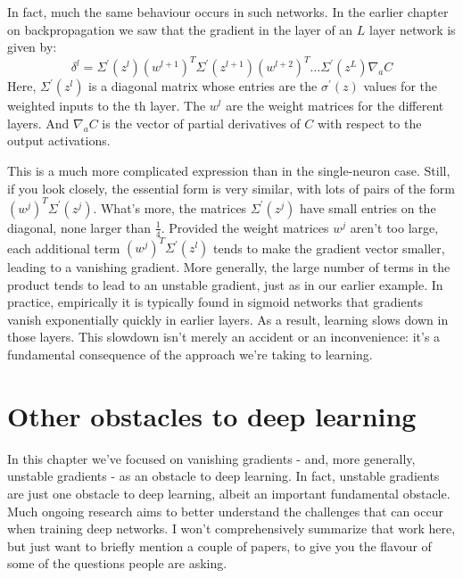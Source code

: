 In fact, much the same behaviour occurs in such networks. In the earlier chapter on backpropagation we saw that the gradient in the \mth{]} layer of an $L$ layer network is given by:
\begin{equation}
    \delta^{l}=\Sigma^{\prime}\left(z^{l}\right)\left(w^{l+1}\right)^{T} \Sigma^{\prime}\left(z^{l+1}\right)\left(w^{l+2}\right)^{T} \ldots \Sigma^{\prime}\left(z^{L}\right) \nabla_{a} C
    \label{eq:c05-124}
\end{equation}
Here, $\Sigma^{\prime}\left(z^{l}\right)$ is a diagonal matrix whose entries are the $\sigma^\prime(z)$ values for the weighted inputs to the th layer. The $w^l$ are the weight matrices for the different layers. And $\nabla_a C$ is the vector of partial derivatives of $C$ with respect to the output activations.

This is a much more complicated expression than in the single-neuron case. Still, if you look closely, the essential form is very similar, with lots of pairs of the form $\left(w^{j}\right)^{T} \Sigma^{\prime}\left(z^{j}\right)$. What's more, the matrices $\Sigma^{\prime}\left(z^{j}\right)$ have small entries on the diagonal, none larger than $\frac{1}{4}$. Provided the weight matrices $w^j$ aren't too large, each additional term $\left(w^{j}\right)^{T} \Sigma^{\prime}\left(z^{l}\right)$ tends to make the gradient vector smaller, leading to a vanishing gradient. More generally, the large number of terms in the product tends to lead to an unstable gradient, just as in our earlier example. In practice, empirically it is typically found in sigmoid networks that gradients vanish exponentially quickly in earlier layers. As a result, learning slows down in those layers. This slowdown isn't merely an accident or an inconvenience: it's a fundamental consequence of the approach we're taking to learning.

\section{Other obstacles to deep learning}

In this chapter we've focused on vanishing gradients - and, more generally, unstable gradients - as an obstacle to deep learning. In fact, unstable gradients are just one obstacle to deep learning, albeit an important fundamental obstacle. Much ongoing research aims to better understand the challenges that can occur when training deep networks. I won't comprehensively summarize that work here, but just want to briefly mention a couple of papers, to give you the flavour of some of the questions people are asking.

